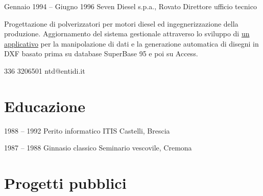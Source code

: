\documentclass[fontsize=10pt]{tccv}
\begin{document}
\begin{eventlist}
\item{Gennaio 1994 -- Giugno 1996}
     {Seven Diesel s.p.a., Rovato}
     {Direttore ufficio tecnico}

Progettazione di polverizzatori per motori diesel ed ingegnerizzazione
della produzione. Aggiornamento del sistema gestionale attraverso lo
sviluppo di \href{http://adg.entidi.com/home/history/}{un applicativo}
per la manipolazione di dati e la generazione automatica di disegni in
DXF basato prima su database SuperBase 95 e poi su Access.

\end{eventlist}

    {336 3206501}
    {ntd@entidi.it}

\section{Educazione}

\begin{yearlist}

\item[Diploma]{1988 -- 1992}
     {Perito informatico}
     {ITIS Castelli, Brescia}

\item{1987 -- 1988}
     {Ginnasio classico}
     {Seminario vescovile, Cremona}

\end{yearlist}

\section{Progetti pubblici}
\end{document}
